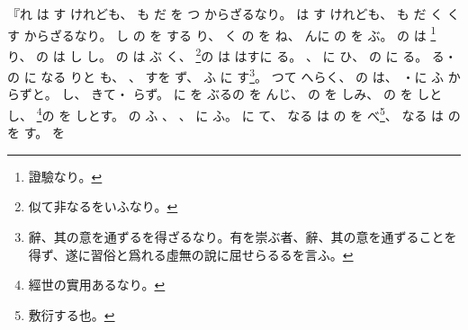 \documentclass[a4paper,12pt]{article}
\begin{document}
\begin{quoting}
『れ%
は%
す%
けれども、%
も%
だ%
を%
つ%
からざるなり。%
は%
す%
けれども、%
も%
だ%
く%
くす%
からざるなり。%
し%
の%
を%
する%
%
り、%
く%
の%
を%
ね、%
んに%
の%
を%
ぶ。%
の%
は%
\footnote{證驗なり。}%
り、%
の%
は%
し%
し。%
の%
は%
ぶ%
く、%
\footnote{似て非なるをいふなり。}の%
は%
はすに%
る。%
、%
に%
ひ、%
の%
に%
る。%
る・%
の%
に%
なる%
%
りと%
も、%
、%
すを%
ず、%
ふ%
に%
す\footnote{辭、其の意を通ずるを得ざるなり。有を崇ぶ者、辭、其の意を通ずることを得ず、遂に習俗と爲れる虛無の說に屈せらるるを言ふ。}。%
つて%
へらく、%
の%
は、%
・に%
ふ%
からずと。%
し、%
きて・%
らず。%
に%
を%
ぶるの%
を%
んじ、%
の%
を%
しみ、%
の%
を%
しとし、%
\footnote{經世の實用あるなり。}の%
を%
しとす。%
の%
ふ%
、%
、%
に%
ふ。%
に%
て、%
なる%
は%
の%
を%
べ\footnote{敷衍する也。}、%
なる%
は%
の%
を%
す。%
を%

\end{quoting}
\end{document}
